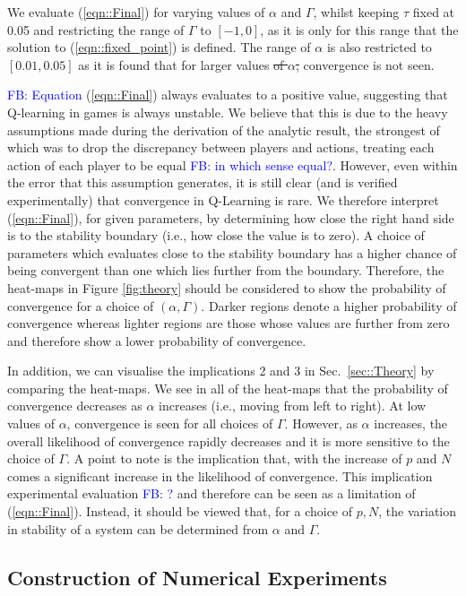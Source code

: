 \documentclass[sigconf,anonymous]{aamas}
\newcommand\fb[1]{\textcolor{blue}{FB: #1}}
\begin{document}
We evaluate (\ref{eqn::Final}) for varying values of $\alpha$ and $\Gamma$, whilst keeping $\tau$ fixed at 0.05 and restricting the range of $\Gamma$ to $[-1, 0]$, as it is only for this range that the solution to (\ref{eqn::fixed_point}) is defined. The range of $\alpha$ is also restricted to $[0.01, 0.05]$ as it is found that for larger values \st{of $\alpha$,} convergence is not seen. 

\fb{Equation} (\ref{eqn::Final}) always evaluates to a positive value, suggesting that Q-learning in games is always unstable. We believe that this is due to the heavy assumptions made during the derivation of the analytic result, the strongest of which was to drop the discrepancy between players and actions, treating each action of each player to be equal \fb{in which sense equal?}. However, even within the error that this assumption generates, it is still clear (and is verified experimentally) that convergence in Q-Learning is rare. We therefore interpret (\ref{eqn::Final}), for given parameters, by determining how close the right hand side is to the stability boundary (i.e., how close the value is to zero). A choice of parameters which evaluates close to the stability boundary has a higher chance of being convergent than one which lies further from the boundary. Therefore, the heat-maps in Figure \ref{fig:theory} should be considered to show the probability of convergence for a choice of $(\alpha, \Gamma)$. Darker regions denote a higher probability of convergence whereas lighter regions are those whose values are further from zero and therefore show a lower probability of convergence.

In addition, we can visualise the implications 2 and 3 in Sec.~\ref{sec::Theory} by comparing the heat-maps. We see in all of the heat-maps that the probability of convergence decreases as $\alpha$ increases (i.e., moving from left to right). At low values of $\alpha$, convergence is seen for all choices of $\Gamma$. However, as $\alpha$ increases, the overall likelihood of convergence rapidly decreases and 
it is more sensitive to the choice of $\Gamma$. A point to note is the implication that, with the increase of $p$ and $N$ comes a significant increase in the likelihood of convergence. This implication experimental evaluation \fb{?} and therefore can be seen as a limitation of (\ref{eqn::Final}). Instead, it should be viewed that, for a choice of $p, N$, the variation in stability of a system can be determined from $\alpha$ and $\Gamma$.

\subsection{Construction of Numerical Experiments}
\end{document}
